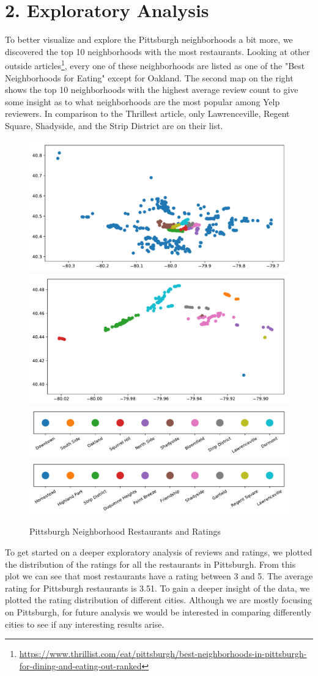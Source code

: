 \documentclass{neu_handout}
\begin{document}
\section*{2. Exploratory Analysis}
To better visualize and explore the Pittsburgh neighborhoods a bit more, we discovered the top 10 neighborhoods with the most restaurants. Looking at other outside articles\footnote{\url{https://www.thrillist.com/eat/pittsburgh/best-neighborhoods-in-pittsburgh-for-dining-and-eating-out-ranked}}, every one of these neighborhoods are listed as one of the "Best Neighborhoods for Eating" except for Oakland. The second map on the right shows the top 10 neighborhoods with the highest average review count to give some insight as to what neighborhoods are the most popular among Yelp reviewers. In comparison to the Thrillest article, only Lawrenceville, Regent Square, Shadyside, and the Strip District are on their list.

\begin{figure}[h]
\centering
{
\includegraphics[width=0.4\linewidth]{top10_hoods_most_restaurants}
}
{
\includegraphics[width=0.4\linewidth]{top10_hoods_highest_avg_review_count}
}
{
\includegraphics[width=0.4\linewidth]{legend1}
}
{
\includegraphics[width=0.4\linewidth]{legend2}
}
\caption{Pittsburgh Neighborhood Restaurants and Ratings}
\end{figure}


To get started on a deeper exploratory analysis of reviews and ratings, we plotted the distribution of the ratings for all the restaurants in Pittsburgh. From this plot we can see that most restaurants have a rating between 3 and 5. The average rating for Pittsburgh restaurants is 3.51. To gain a deeper insight of the data, we plotted the rating distribution of different cities. Although we are mostly focusing on Pittsburgh, for future analysis we would be interested in comparing differently cities to see if any interesting results arise.
\end{document}
